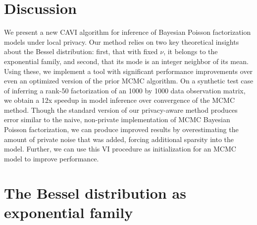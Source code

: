 \documentclass[letterpaper]{article}
\begin{document}
  \section{Discussion}
  We present a new CAVI algorithm for inference of Bayesian Poisson
  factorization models under local privacy. Our method relies on two key
  theoretical insights about the Bessel distribution: first, that with fixed
  $\nu$, it belongs to the exponential family, and second, that its mode is an
  integer neighbor of its mean. Using these, we implement a tool with
  significant performance improvements over even an optimized version of the
  prior MCMC algorithm. On a synthetic test case of inferring a rank-50
  factorization of an 1000 by 1000 data observation matrix, we obtain a 12x
  speedup in model inference over convergence of the MCMC method. Though the
  standard version of our privacy-aware method produces error similar to the
  naive, non-private implementation of MCMC Bayesian Poisson factorization, we
  can produce improved results by overestimating the amount of private noise
  that was added, forcing additional sparsity into the model. Further, we can
  use this VI procedure as initialization for an MCMC model to improve
  performance.
  
  
  
  
  \appendix
  
  \section{The Bessel distribution as exponential family}
  \label{sec:expfambessel}
  
\end{document}
